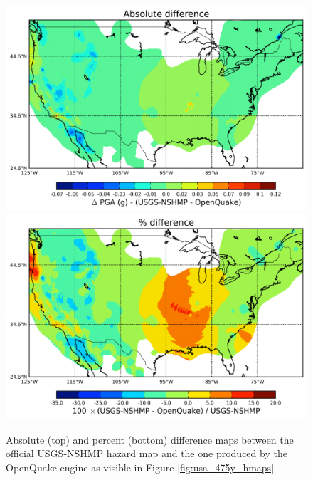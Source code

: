 \begin{figure}
\centering
\includegraphics[width=14cm]{./qareport/pictures/map_usa_PGA_0pt1_abs_diff_NSHMP_OQ.pdf}
\includegraphics[width=14cm]{./qareport/pictures/map_usa_PGA_0pt1_percent_diff_NSHMP_OQ.pdf}
\caption{Absolute (top) and percent (bottom) difference maps between the official USGS-NSHMP hazard map and the one produced by the OpenQuake-engine as visible in Figure \ref{fig:usa_475y_hmaps}}
\label{fig:usa_475y_dmaps}
\end{figure}

